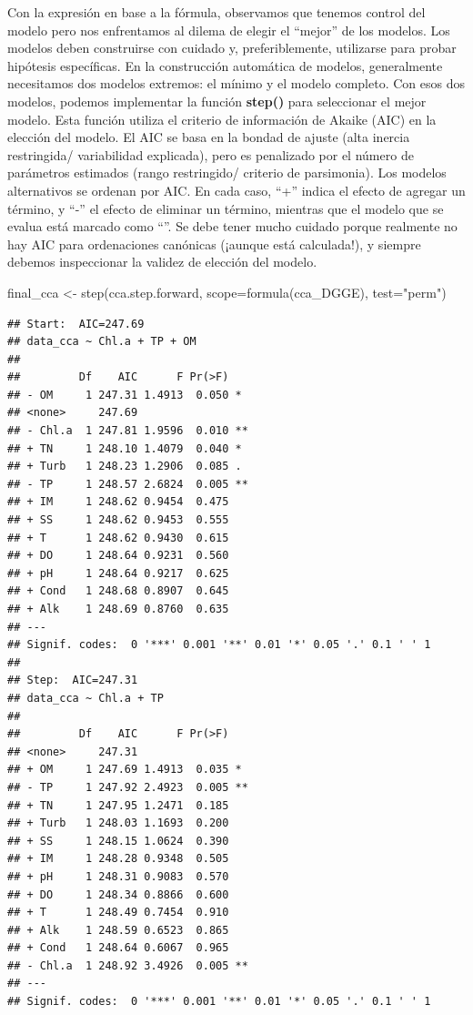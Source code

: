 \documentclass[
]{book}
\newenvironment{Shaded}{\begin{snugshade}}{\end{snugshade}}
\newcommand{\AttributeTok}[1]{\textcolor[rgb]{0.77,0.63,0.00}{#1}}
\newcommand{\FunctionTok}[1]{\textcolor[rgb]{0.00,0.00,0.00}{#1}}
\newcommand{\NormalTok}[1]{#1}
\newcommand{\OtherTok}[1]{\textcolor[rgb]{0.56,0.35,0.01}{#1}}
\newcommand{\StringTok}[1]{\textcolor[rgb]{0.31,0.60,0.02}{#1}}
\begin{document}
Con la expresión en base a la fórmula, observamos que tenemos control del modelo pero nos enfrentamos al dilema de elegir el ``mejor'' de los modelos.
Los modelos deben construirse con cuidado y, preferiblemente, utilizarse para probar
hipótesis específicas. En la construcción automática de modelos, generalmente necesitamos dos modelos extremos: el mínimo y el modelo completo. Con esos dos modelos, podemos implementar la función \textbf{step()} para seleccionar el mejor modelo. Esta función utiliza el criterio de información de Akaike (AIC) en la elección del modelo. El AIC se basa en la bondad de ajuste (alta inercia restringida/ variabilidad explicada), pero es penalizado por el número de parámetros estimados (rango restringido/ criterio de parsimonia). Los modelos alternativos se ordenan por AIC. En cada caso, ``+'' indica el efecto de agregar un término, y ``-'' el efecto de eliminar un término, mientras que el modelo que se evalua está marcado como ``''. Se debe tener mucho cuidado porque realmente no hay AIC para ordenaciones canónicas (¡aunque está calculada!), y siempre debemos inspeccionar la validez de elección del modelo.

\begin{Shaded}
\begin{Highlighting}[]
\NormalTok{final\_cca }\OtherTok{\textless{}{-}} \FunctionTok{step}\NormalTok{(cca.step.forward, }\AttributeTok{scope=}\FunctionTok{formula}\NormalTok{(cca\_DGGE), }\AttributeTok{test=}\StringTok{"perm"}\NormalTok{)}
\end{Highlighting}
\end{Shaded}

\begin{verbatim}
## Start:  AIC=247.69
## data_cca ~ Chl.a + TP + OM
## 
##         Df    AIC      F Pr(>F)   
## - OM     1 247.31 1.4913  0.050 * 
## <none>     247.69                 
## - Chl.a  1 247.81 1.9596  0.010 **
## + TN     1 248.10 1.4079  0.040 * 
## + Turb   1 248.23 1.2906  0.085 . 
## - TP     1 248.57 2.6824  0.005 **
## + IM     1 248.62 0.9454  0.475   
## + SS     1 248.62 0.9453  0.555   
## + T      1 248.62 0.9430  0.615   
## + DO     1 248.64 0.9231  0.560   
## + pH     1 248.64 0.9217  0.625   
## + Cond   1 248.68 0.8907  0.645   
## + Alk    1 248.69 0.8760  0.635   
## ---
## Signif. codes:  0 '***' 0.001 '**' 0.01 '*' 0.05 '.' 0.1 ' ' 1
## 
## Step:  AIC=247.31
## data_cca ~ Chl.a + TP
## 
##         Df    AIC      F Pr(>F)   
## <none>     247.31                 
## + OM     1 247.69 1.4913  0.035 * 
## - TP     1 247.92 2.4923  0.005 **
## + TN     1 247.95 1.2471  0.185   
## + Turb   1 248.03 1.1693  0.200   
## + SS     1 248.15 1.0624  0.390   
## + IM     1 248.28 0.9348  0.505   
## + pH     1 248.31 0.9083  0.570   
## + DO     1 248.34 0.8866  0.600   
## + T      1 248.49 0.7454  0.910   
## + Alk    1 248.59 0.6523  0.865   
## + Cond   1 248.64 0.6067  0.965   
## - Chl.a  1 248.92 3.4926  0.005 **
## ---
## Signif. codes:  0 '***' 0.001 '**' 0.01 '*' 0.05 '.' 0.1 ' ' 1
\end{verbatim}
\end{document}
